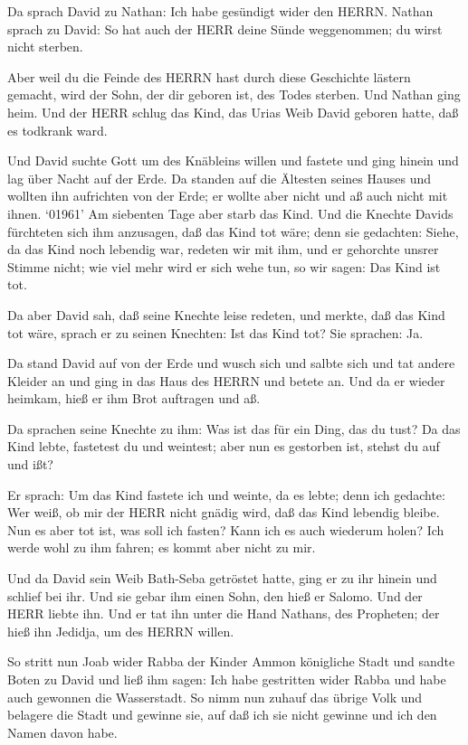  Da sprach David zu Nathan: Ich habe gesündigt wider den
HERRN. Nathan sprach zu David: So hat auch der HERR deine Sünde
weggenommen; du wirst nicht sterben.

 Aber weil du die Feinde des HERRN hast durch diese
Geschichte lästern gemacht, wird der Sohn, der dir geboren ist, des
Todes sterben.  Und Nathan ging heim. Und der HERR schlug
das Kind, das Urias Weib David geboren hatte, daß es todkrank ward.

 Und David suchte Gott um des Knäbleins willen und fastete
und ging hinein und lag über Nacht auf der Erde.  Da
standen auf die Ältesten seines Hauses und wollten ihn aufrichten von
der Erde; er wollte aber nicht und aß auch nicht mit ihnen.
 `01961' Am siebenten Tage aber starb das Kind. Und die
Knechte Davids fürchteten sich ihm anzusagen, daß das Kind tot wäre;
denn sie gedachten: Siehe, da das Kind noch lebendig war, redeten wir
mit ihm, und er gehorchte unsrer Stimme nicht; wie viel mehr wird er
sich wehe tun, so wir sagen: Das Kind ist tot.

 Da aber David sah, daß seine Knechte leise redeten, und
merkte, daß das Kind tot wäre, sprach er zu seinen Knechten: Ist das
Kind tot? Sie sprachen: Ja.

 Da stand David auf von der Erde und wusch sich und salbte
sich und tat andere Kleider an und ging in das Haus des HERRN und betete
an. Und da er wieder heimkam, hieß er ihm Brot auftragen und aß.

 Da sprachen seine Knechte zu ihm: Was ist das für ein
Ding, das du tust? Da das Kind lebte, fastetest du und weintest; aber
nun es gestorben ist, stehst du auf und ißt?

 Er sprach: Um das Kind fastete ich und weinte, da es
lebte; denn ich gedachte: Wer weiß, ob mir der HERR nicht gnädig wird,
daß das Kind lebendig bleibe.  Nun es aber tot ist, was
soll ich fasten? Kann ich es auch wiederum holen? Ich werde wohl zu ihm
fahren; es kommt aber nicht zu mir.

 Und da David sein Weib Bath-Seba getröstet hatte, ging er
zu ihr hinein und schlief bei ihr. Und sie gebar ihm einen Sohn, den
hieß er Salomo. Und der HERR liebte ihn.  Und er tat ihn
unter die Hand Nathans, des Propheten; der hieß ihn Jedidja, um des
HERRN willen.

 So stritt nun Joab wider Rabba der Kinder Ammon königliche
Stadt  und sandte Boten zu David und ließ ihm sagen: Ich
habe gestritten wider Rabba und habe auch gewonnen die Wasserstadt.
 So nimm nun zuhauf das übrige Volk und belagere die Stadt
und gewinne sie, auf daß ich sie nicht gewinne und ich den Namen davon
habe.

